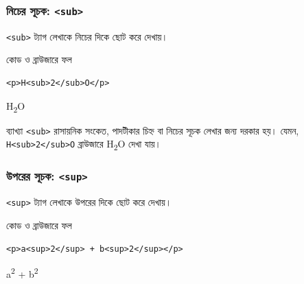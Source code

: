 \subsubsection{নিচের সূচক: \texttt{<sub>}}

\texttt{<sub>} ট্যাগ লেখাকে নিচের দিকে ছোট করে দেখায়।

\begin{chFourWholeExample}{কোড ও ব্রাউজারে ফল}
\noindent
\begin{minipage}[t]{.50\linewidth}\vspace{0pt}

\begin{verbatim}
<p>H<sub>2</sub>O</p>
\end{verbatim}

\end{minipage}\hfill
\begin{minipage}[t]{.46\linewidth}\vspace{0pt}
H\textsubscript{2}O
\end{minipage}

\end{chFourWholeExample}

\begin{keypointbox}{ব্যাখ্যা}
\texttt{<sub>} রাসায়নিক সংকেত, পাদটীকার চিহ্ন বা নিচের সূচক লেখার জন্য দরকার হয়। যেমন, \texttt{H<sub>2</sub>O} ব্রাউজারে H\textsubscript{2}O দেখা যায়।
\end{keypointbox}

\subsubsection{উপরের সূচক: \texttt{<sup>}}

\texttt{<sup>} ট্যাগ লেখাকে উপরের দিকে ছোট করে দেখায়।

\begin{chFourWholeExample}{কোড ও ব্রাউজারে ফল}
\noindent
\begin{minipage}[t]{.50\linewidth}\vspace{0pt}

\begin{verbatim}
<p>a<sup>2</sup> + b<sup>2</sup></p>
\end{verbatim}

\end{minipage}\hfill
\begin{minipage}[t]{.46\linewidth}\vspace{0pt}
a\textsuperscript{2} + b\textsuperscript{2}
\end{minipage}

\end{chFourWholeExample}

